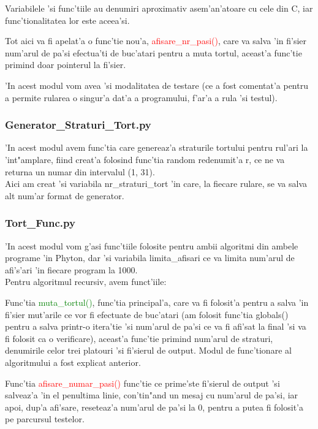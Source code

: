 \documentclass{article}
\begin{document}
Variabilele 'si func'tiile au denumiri aproximativ asem'an'atoare cu cele din C, iar func'tionalitatea lor este aceea'si.

Tot aici va fi apelat'a o func'tie nou'a, \textcolor{red}{afisare\_nr\_pasi()}, care va salva 'in fi'sier num'arul de pa'si efectua'ti de buc'atari pentru a muta tortul, aceast'a func'tie primind doar pointerul la fi'sier.

'In acest modul vom avea 'si modalitatea de testare (ce a fost comentat'a pentru a permite rularea o singur'a dat'a a programului, f'ar'a a rula 'si testul).

\newpage

\subsubsection{Generator\_Straturi\_Tort.py}

'In acest modul avem func'tia care genereaz'a straturile tortului pentru rul'ari la 'int"amplare, fiind creat'a folosind func'tia random redenumit'a r, ce ne va returna un numar din intervalul (1, 31).\\
Aici am creat 'si variabila nr\_straturi\_tort 'in care, la fiecare rulare, se va salva alt num'ar format de generator.


\subsubsection{Tort\_Func.py}
 
'In acest modul vom g'asi func'tiile folosite pentru ambii algoritmi din ambele programe 'in Phyton, dar 'si variabila limita\_afisari ce va limita num'arul de afi's'ari 'in fiecare program la 1000.\\

Pentru algoritmul recursiv, avem funct'iile: 

Func'tia \textcolor{green}{muta\_tortul()}, func'tia principal'a, care va fi folosit'a pentru a salva 'in fi'sier mut'arile ce vor fi efectuate de buc'atari (am folosit func'tia globals() pentru a salva printr-o itera'tie 'si num'arul de pa'si ce va fi afi'sat la final 'si va fi folosit ca o verificare), aceast'a func'tie primind num'arul de straturi, denumirile celor trei platouri 'si fi'sierul de output. Modul de func'tionare al algoritmului a fost explicat anterior.

Func'tia \textcolor{red}{afisare\_numar\_pasi()} func'tie ce prime'ste fi'sierul de output 'si salveaz'a 'in el penultima linie, con'tin"and un mesaj cu num'arul de pa'si, iar apoi, dup'a afi'sare, reseteaz'a num'arul de pa'si la 0, pentru a putea fi folosit'a pe parcursul testelor.
\end{document}

